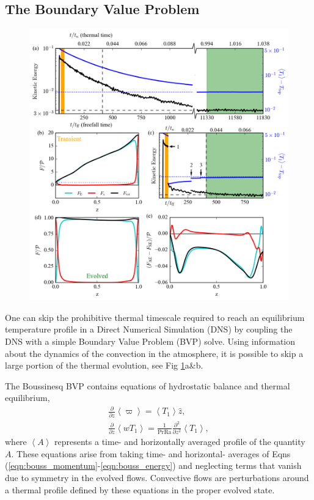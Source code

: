\documentclass[aps, pre, onecolumn, nofootinbib, notitlepage, groupedaddress, amsfonts, amssymb, amsmath, longbibliography]{revtex4-1}
\newcommand{\angles}[1]{\ensuremath{\left\langle #1 \right\rangle}}
\begin{document}
\subsection{The Boundary Value Problem}
\begin{figure}[b]
\includegraphics[width=\textwidth]{./figs/time_trace.png}
\caption{\label{fig:time_trace} }
\end{figure}

One can skip the prohibitive thermal timescale required to reach an equilibrium temperature profile
in a Direct Numerical Simulation (DNS) by coupling the DNS with a simple Boundary Value Problem
(BVP) solve. Using information about the dynamics of the convection in the atmosphere, it is possible
to skip a large portion of the thermal evolution, see Fig \ref{fig:time_trace}a\&b.

The Boussinesq BVP contains equations of hydrostatic balance and thermal equilibrium,
\begin{gather}
\frac{\partial}{\partial z}\angles{\varpi} = \angles{T_1}\hat{z},
	\label{eqn:bouss_BVP_momentum}
\\
\frac{\partial}{\partial z}\angles{wT_1} = \frac{1}{\text{Pr}\text{Ra}}\frac{\partial^2}{\partial z^2} \angles{T_1},
	\label{eqn:bouss_BVP_energy}
\end{gather}
where $\angles{A}$ represents a time- and horizontally averaged profile of the quantity $A$.  
These
equations arise from taking time- and horizontal- averages of Eqns (\ref{eqn:bouss_momentum}-\ref{eqn:bouss_energy})
and neglecting terms that vanish due to symmetry in the evolved flows.  Convective flows
are perturbations around a thermal profile defined by these equations in the proper evolved state.
\end{document}

